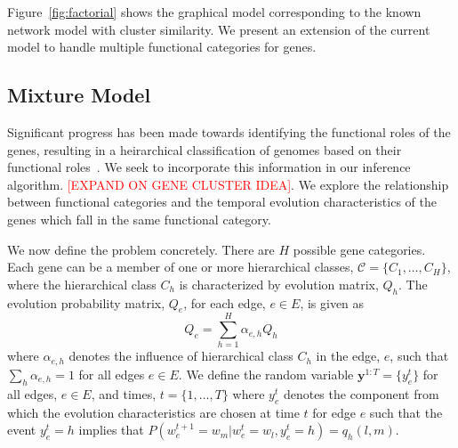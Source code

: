 \documentclass{bioinfo}
\begin{document}
\begin{methods}
Figure~\ref{fig:factorial} shows the graphical model corresponding to
the known network model with cluster similarity. We present an
extension of the current model to handle multiple functional
categories for genes.
 
\subsection{Mixture Model}
\label{sec:mixture-model}
Significant progress has been
made towards identifying the functional roles of the genes, resulting
in a heirarchical classification of genomes based on their functional
roles~\cite{DBLP:journals/nar/MewesAHLP97}. We seek to incorporate
this information in our inference algorithm. \textcolor{red}{[EXPAND ON GENE CLUSTER
IDEA]}. We  explore the relationship between functional
categories and the temporal evolution characteristics of the genes
which fall in the same functional category.

We now define the problem concretely. There are $H$ possible gene
categories. Each gene can be a member of one or more hierarchical
classes, $\mathcal{C}=\{C_{1},\ldots , C_{H}\}$, where the
hierarchical class $C_{h}$ is characterized by evolution matrix,
$Q_{h}$. The evolution probability matrix, $Q_{e}$, for each edge,
$e\in E$, is given as 
\begin{equation}
  \label{eq:q-mixture}
  Q_{e} = \sum_{h=1}^{H} \alpha_{e,h} Q_{h}
\end{equation}
where $\alpha_{e,h}$ denotes the influence of hierarchical class
$C_{h}$ in the edge, $e$, such that $\sum_{h} \alpha_{e, h} = 1$
for all edges $e \in E$. We define the random variable
$\mathbf{y}^{1:T} = \{y_e^t\}$ for all edges, $e \in E$,  and times,
$t=\{1,\ldots, T\}$ where $y^t_e$
denotes the component from which the evolution characteristics are
chosen at time $t$ for edge $e$ such that the event $y_e^t = h$
implies that $P(w_e^{t+1}= w_m | w^t_e =w_l, y_e^t = h) = q_h(l, m)$.


\end{methods}
\end{document}
